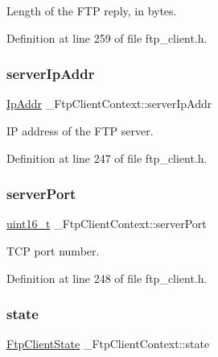 Length of the F\+TP reply, in bytes. 



Definition at line 259 of file ftp\+\_\+client.\+h.

\mbox{\label{struct__FtpClientContext_a8171ee967d54074438de5fb81c7cb4b8}} 
\subsubsection{\texorpdfstring{server\+Ip\+Addr}{serverIpAddr}}
{\footnotesize\ttfamily \hyperlink{structIpAddr}{Ip\+Addr} \+\_\+\+Ftp\+Client\+Context\+::server\+Ip\+Addr}



IP address of the F\+TP server. 



Definition at line 247 of file ftp\+\_\+client.\+h.

\mbox{\label{struct__FtpClientContext_a55bde2ffc6f77269f07e6f68fa8d0b3f}} 
\subsubsection{\texorpdfstring{server\+Port}{serverPort}}
{\footnotesize\ttfamily \hyperlink{stdint_8h_a273cf69d639a59973b6019625df33e30}{uint16\+\_\+t} \+\_\+\+Ftp\+Client\+Context\+::server\+Port}



T\+CP port number. 



Definition at line 248 of file ftp\+\_\+client.\+h.

\mbox{\label{struct__FtpClientContext_ab3d3243d5ccbc94b6831a5c4cab236f0}} 
\subsubsection{\texorpdfstring{state}{state}}
{\footnotesize\ttfamily \hyperlink{ftp__client_8h_a27b79c28175d6b10ba3395f09b15d32f}{Ftp\+Client\+State} \+\_\+\+Ftp\+Client\+Context\+::state}



